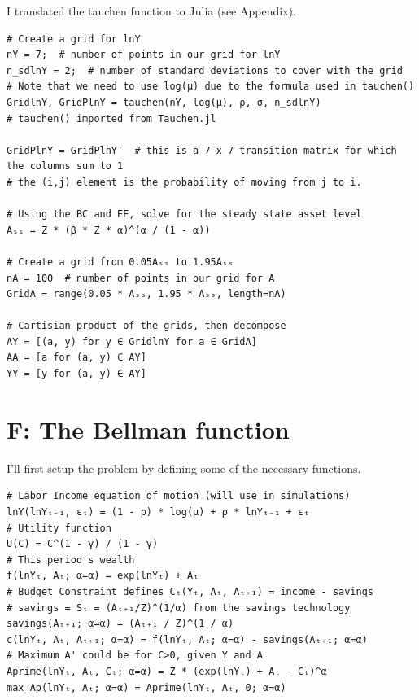 \documentclass[12pt]{article}
\begin{document}
I translated the tauchen function to Julia (see Appendix).

\begin{lstlisting}[language=JuliaLocal, style=julia]
# Create a grid for lnY
nY = 7;  # number of points in our grid for lnY
n_sdlnY = 2;  # number of standard deviations to cover with the grid
# Note that we need to use log(μ) due to the formula used in tauchen()
GridlnY, GridPlnY = tauchen(nY, log(μ), ρ, σ, n_sdlnY)
# tauchen() imported from Tauchen.jl

GridPlnY = GridPlnY'  # this is a 7 x 7 transition matrix for which the columns sum to 1
# the (i,j) element is the probability of moving from j to i.

# Using the BC and EE, solve for the steady state asset level
Aₛₛ = Z * (β * Z * α)^(α / (1 - α))

# Create a grid from 0.05Aₛₛ to 1.95Aₛₛ
nA = 100  # number of points in our grid for A
GridA = range(0.05 * Aₛₛ, 1.95 * Aₛₛ, length=nA)

# Cartisian product of the grids, then decompose
AY = [(a, y) for y ∈ GridlnY for a ∈ GridA]
AA = [a for (a, y) ∈ AY]
YY = [y for (a, y) ∈ AY]
\end{lstlisting}











\newpage
\section*{F: The Bellman function}

I'll first setup the problem by defining some of the necessary functions.

\begin{lstlisting}[language=JuliaLocal, style=julia]
# Labor Income equation of motion (will use in simulations)
lnY(lnYₜ₋₁, εₜ) = (1 - ρ) * log(μ) + ρ * lnYₜ₋₁ + εₜ
# Utility function
U(C) = C^(1 - γ) / (1 - γ)
# This period's wealth
f(lnYₜ, Aₜ; α=α) = exp(lnYₜ) + Aₜ
# Budget Constraint defines Cₜ(Yₜ, Aₜ, Aₜ₊₁) = income - savings
# savings = Sₜ = (Aₜ₊₁/Z)^(1/α) from the savings technology
savings(Aₜ₊₁; α=α) = (Aₜ₊₁ / Z)^(1 / α)
c(lnYₜ, Aₜ, Aₜ₊₁; α=α) = f(lnYₜ, Aₜ; α=α) - savings(Aₜ₊₁; α=α)
# Maximum A' could be for C>0, given Y and A
Aprime(lnYₜ, Aₜ, Cₜ; α=α) = Z * (exp(lnYₜ) + Aₜ - Cₜ)^α
max_Ap(lnYₜ, Aₜ; α=α) = Aprime(lnYₜ, Aₜ, 0; α=α)
\end{lstlisting}
\end{document}
